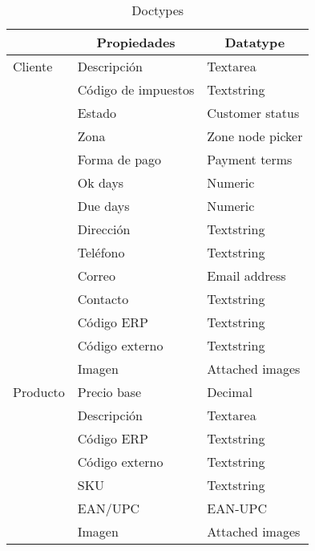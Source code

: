 \begin{longtable}{ | p{5em} | l | l | }
    \caption{Doctypes}
    \label{table:doctypes} \\

    \hline
    \rowcolor{gray!30}
    \multicolumn{1}{|c|}{Doctype} &
    \multicolumn{1}{|c|}{Propiedades} &
    \multicolumn{1}{|c|}{Datatype} \\
    \hline
    \endhead

    \hline
    \endfoot

    \endlastfoot

    Cliente
        & Descripción & Textarea \\
        \cline{2-3}
        & Código de impuestos & Textstring \\
        \cline{2-3}
        & Estado & Customer status \\
        \cline{2-3}
        & Zona & Zone node picker \\
        \cline{2-3}
        & Forma de pago & Payment terms \\
        \cline{2-3}
        & Ok days & Numeric \\
        \cline{2-3}
        & Due days & Numeric \\
        \cline{2-3}
        & Dirección & Textstring \\
        \cline{2-3}
        & Teléfono & Textstring \\
        \cline{2-3}
        & Correo & Email address \\
        \cline{2-3}
        & Contacto & Textstring \\
        \cline{2-3}
        & Código ERP & Textstring \\
        \cline{2-3}
        & Código externo & Textstring \\
        \cline{2-3}
        & Imagen & Attached images \\
    \hline

    Producto
        & Precio base & Decimal \\
        \cline{2-3}
        & Descripción & Textarea \\
        \cline{2-3}
        & Código ERP & Textstring \\
        \cline{2-3}
        & Código externo & Textstring \\
        \cline{2-3}
        & SKU & Textstring \\
        \cline{2-3}
        & EAN/UPC & EAN-UPC \\
        \cline{2-3}
        & Imagen & Attached images \\
    \hline


\end{longtable}
